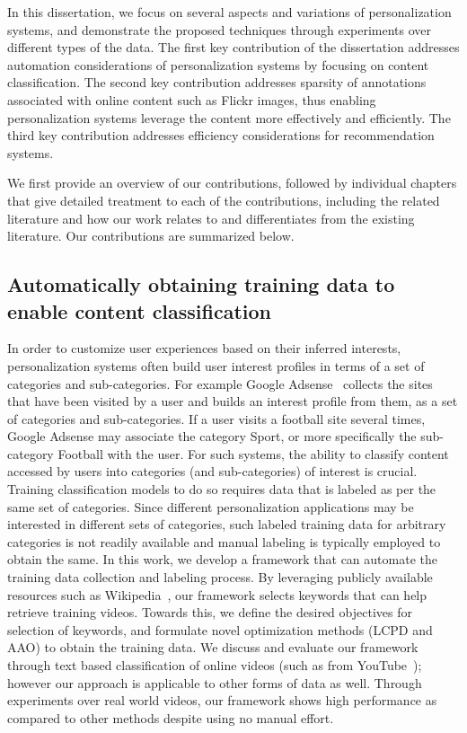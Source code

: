 \documentclass[12pt]{ucsddissertation}
\begin{document}

In this dissertation, we focus on several aspects and variations of personalization systems, and demonstrate the proposed techniques through experiments over different types of the data. The first key contribution of the dissertation addresses automation considerations of personalization systems by focusing on content classification. The second key contribution addresses sparsity of annotations associated with online content such as Flickr images, thus enabling personalization systems leverage the content more effectively and efficiently. The third key contribution addresses efficiency considerations for recommendation systems. 

We first provide an overview of our contributions, followed by individual chapters that give detailed treatment to each of the contributions, including the related literature and how our work relates to and differentiates from the existing literature. Our contributions are summarized below. 

\subsection{Automatically obtaining training data to enable content classification}

In order to customize user experiences based on their inferred interests, personalization systems often build user interest profiles in terms of a set of categories and sub-categories. For example Google Adsense~\cite{GoogleAdsense} collects the sites that have been visited by a user and builds an interest profile from them, as a set of categories and sub-categories. If a user visits a football site several times, Google Adsense may associate the category Sport, or more specifically the sub-category Football with the user. For such systems, the ability to classify content accessed by users into categories (and sub-categories) of interest is crucial. Training classification models to do so requires data that is labeled as per the same set of categories. Since different personalization applications may be interested in different sets of categories, such labeled training data for arbitrary categories is not readily available and manual labeling is typically employed to obtain the same. In this work, we develop a framework that can automate the training data collection and labeling process. 
By leveraging publicly available resources such as Wikipedia~\cite{website:Wikipedia}, our framework selects keywords that can help retrieve training videos. 
Towards this, we define the desired objectives for selection of keywords, and formulate novel optimization methods (LCPD and AAO) to obtain the training data. 
We discuss and evaluate our framework through text based classification of online videos (such as from YouTube~\cite{Youtube}); however our approach is applicable to other forms of data as well. 
Through experiments over real world videos, our framework shows high performance as compared to other methods despite using no manual effort. 
\end{document}
